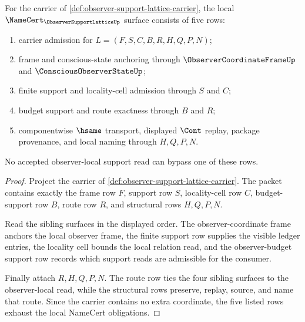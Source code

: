 \begin{theorem}
\label{thm:observer-support-lattice-namecert-obligations}
For the carrier of \autoref{def:observer-support-lattice-carrier}, the local $\NameCert_{\ObserverSupportLatticeUp}$ surface consists of five rows:
\begin{enumerate}
\item carrier admission for $L=(F,S,C,B,R,H,Q,P,N)$;
\item frame and conscious-state anchoring through $\ObserverCoordinateFrameUp$ and $\ConsciousObserverStateUp$;
\item finite support and locality-cell admission through $S$ and $C$;
\item budget support and route exactness through $B$ and $R$;
\item componentwise $\hsame$ transport, displayed $\Cont$ replay, package provenance, and local naming through $H,Q,P,N$.
\end{enumerate}
No accepted observer-local support read can bypass one of these rows.
\end{theorem}
\begin{proof}
Project the carrier of \autoref{def:observer-support-lattice-carrier}. The packet contains exactly the frame row $F$, support row $S$, locality-cell row $C$, budget-support row $B$, route row $R$, and structural rows $H,Q,P,N$.

Read the sibling surfaces in the displayed order. The observer-coordinate frame anchors the local observer frame, the finite support row supplies the visible ledger entries, the locality cell bounds the local relation read, and the observer-budget support row records which support reads are admissible for the consumer.

Finally attach $R,H,Q,P,N$. The route row ties the four sibling surfaces to the observer-local read, while the structural rows preserve, replay, source, and name that route. Since the carrier contains no extra coordinate, the five listed rows exhaust the local NameCert obligations.
\end{proof}

